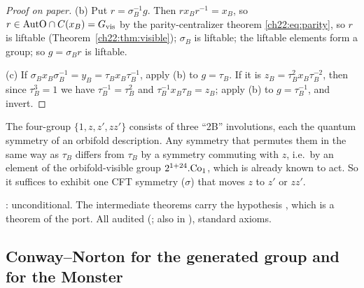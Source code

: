 \begin{proof}[Proof on paper]
(b) Put $r=\sigma_B^{-1}g$.  Then $rx_Br^{-1}=x_B$, so $r\in\mathrm{AutO}\cap C(x_B)=G_{\mathrm{vis}}$ by the
parity-centralizer theorem \eqref{ch22:eq:parity}, so $r$ is liftable (Theorem~\ref{ch22:thm:visible}); $\sigma_B$ is liftable;
the liftable elements form a group; so $g=\sigma_Br$ is liftable.

(c) If $\sigma_Bx_B\sigma_B^{-1}=y_B=\tau_Bx_B\tau_B^{-1}$, apply (b) to $g=\tau_B$.  If it is $z_B=\tau_B^2x_B\tau_B^{-2}$, then
since $\tau_B^3=1$ we have $\tau_B^{-1}=\tau_B^2$ and $\tau_B^{-1}x_B\tau_B=z_B$; apply (b) to $g=\tau_B^{-1}$, and invert.
\end{proof}
\begin{physics}
The four-group $\{1,z,z',zz'\}$ consists of three ``2B'' involutions, each the quantum symmetry of an orbifold
description.  Any symmetry that permutes them in the same way as $\tau_B$ differs from $\tau_B$ by a symmetry commuting with
$z$, i.e.\ by an element of the orbifold-visible group $2^{1+24}.\mathrm{Co}_1$, which is already known to act.  So
it suffices to exhibit one CFT symmetry ($\sigma$) that moves $z$ to $z'$ or $zz'$.
\end{physics}
\begin{status}
: unconditional.  The intermediate theorems carry the hypothesis , which is a
theorem of the port.  All audited (;  also in
), standard axioms.
\end{status}


\subsection{Conway--Norton for the generated group and for the Monster}

